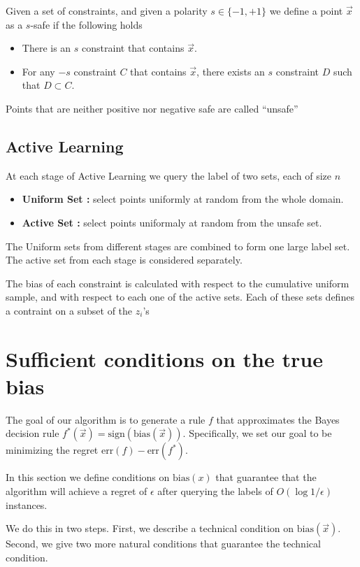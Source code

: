 \documentclass{article}
\newcommand{\err}{\mbox{err}}
\newcommand{\x}{\vec{x}}
\newcommand{\bias}{\text{bias}}
\newcommand{\sign}{\text{sign}}
\begin{document}
Given a set of constraints, and given a polarity  $s \in
\{-1,+1\}$ we define a point $\x$ as a $s$-safe if
the following holds
\begin{itemize}
\item There is an $s$ constraint that contains $\x$.
\item For any $-s$ constraint $C$ that contains $\x$, there exists an
  $s$ constraint $D$ such that $D \subset C$. 
\end{itemize}

Points that are neither positive nor negative safe are called
``unsafe''

\subsection{Active Learning}

At each stage of Active Learning we query the label of two sets, each
of size $n$
\begin{itemize}
\item {\bf Uniform Set :} select points uniformly at random from the whole
  domain.
\item {\bf Active Set :} select points uniformaly at random from the unsafe
  set.
\end{itemize}

The Uniform sets from different stages are combined to form one
large label set. The active set from each stage is considered
separately.

The bias of each constraint is calculated with respect to the
cumulative uniform sample, and with respect to each one of the active
sets. Each of these sets defines a contraint on a subset of the $z_i$'s 

\section{Sufficient conditions on the true bias}
\newcommand{\Bayes}{f^*}
The goal of our algorithm is to generate a rule $f$ that
approximates the Bayes decision rule $\Bayes(\x) = \sign(\bias(\x))$.
Specifically, we set our goal to be minimizing the regret $\err(f) - \err(\Bayes)$.

In this section we define conditions on $\bias(x)$ that guarantee that
the algorithm will achieve a regret of $\epsilon$ after querying the
labels of $O(\log 1/\epsilon)$ instances.

We do this in two steps. First, we describe a technical condition on
$\bias(\x)$. Second, we give two more natural conditions that
guarantee the technical condition.
\end{document}
